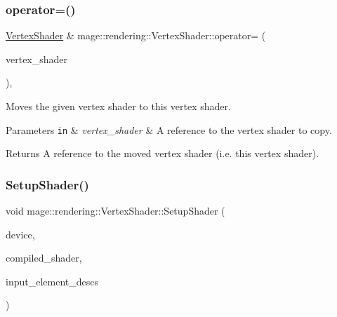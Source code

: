 \subsubsection{\texorpdfstring{operator=()}{operator=()}\hspace{0.1cm}{\footnotesize\ttfamily [2/2]}}
{\footnotesize\ttfamily \mbox{\hyperlink{classmage_1_1rendering_1_1_vertex_shader}{Vertex\+Shader}} \& mage\+::rendering\+::\+Vertex\+Shader\+::operator= (\begin{DoxyParamCaption}\item[{\mbox{\hyperlink{classmage_1_1rendering_1_1_vertex_shader}{Vertex\+Shader}} \&\&}]{vertex\+\_\+shader }\end{DoxyParamCaption})\hspace{0.3cm}{\ttfamily [default]}, {\ttfamily [noexcept]}}

Moves the given vertex shader to this vertex shader.


\begin{DoxyParams}[1]{Parameters}
\mbox{\tt in}  & {\em vertex\+\_\+shader} & A reference to the vertex shader to copy. \\
\hline
\end{DoxyParams}
\begin{DoxyReturn}{Returns}
A reference to the moved vertex shader (i.\+e. this vertex shader). 
\end{DoxyReturn}
\mbox{\label{classmage_1_1rendering_1_1_vertex_shader_a09e717d181f09bd4e50a758bd804705b}} 
\subsubsection{\texorpdfstring{Setup\+Shader()}{SetupShader()}}
{\footnotesize\ttfamily void mage\+::rendering\+::\+Vertex\+Shader\+::\+Setup\+Shader (\begin{DoxyParamCaption}\item[{I\+D3\+D11\+Device \&}]{device,  }\item[{const \mbox{\hyperlink{classmage_1_1rendering_1_1_compiled_shader}{Compiled\+Shader}} \&}]{compiled\+\_\+shader,  }\item[{gsl\+::span$<$ const D3\+D11\+\_\+\+I\+N\+P\+U\+T\+\_\+\+E\+L\+E\+M\+E\+N\+T\+\_\+\+D\+E\+SC $>$}]{input\+\_\+element\+\_\+descs }\end{DoxyParamCaption})\hspace{0.3cm}{\ttfamily [private]}}

